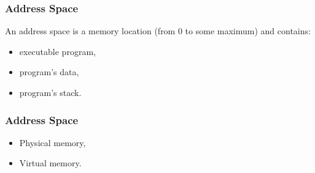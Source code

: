   \begin{frame}
    \frametitle{Address Space}
    An address space is a memory location (from 0 to some maximum) and contains:
      \begin{itemize}
        \item executable program,
        \item program's data,
        \item program's stack.
      \end{itemize}
  \end{frame}
  \begin{frame}
    \frametitle{Address Space}
      \begin{itemize}
        \item Physical memory,
        \item Virtual memory.
      \end{itemize}
  \end{frame}


